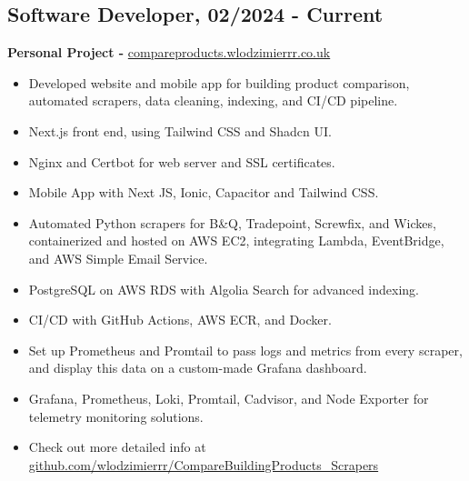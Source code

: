 \documentclass[a4paper,10pt]{article}
\begin{document}
\subsection*{Software Developer, 02/2024 - Current}
\textbf{Personal Project - } \href{https://compareproducts.wlodzimierrr.co.uk}{compareproducts.wlodzimierrr.co.uk}
\begin{itemize}
    \item Developed website and mobile app for building product comparison, automated scrapers, data cleaning, indexing, and CI/CD pipeline.
    \item Next.js front end, using Tailwind CSS and Shadcn UI.
    \item Nginx and Certbot for web server and SSL certificates.
    \item Mobile App with Next JS, Ionic, Capacitor and Tailwind CSS.
    \item Automated Python scrapers for B\&Q, Tradepoint, Screwfix, and Wickes, containerized and hosted on AWS EC2, integrating Lambda, EventBridge, and AWS Simple Email Service.
    \item PostgreSQL on AWS RDS with Algolia Search for advanced indexing.
    \item CI/CD with GitHub Actions, AWS ECR, and Docker.
    \item Set up Prometheus and Promtail to pass logs and metrics from every scraper, and display this data on a custom-made Grafana dashboard.
    \item Grafana, Prometheus, Loki, Promtail, Cadvisor, and Node Exporter for telemetry monitoring solutions.
    \item Check out more detailed info at \href{https://github.com/wlodzimierrr/CompareBuildingProducts\_Scrapers}{github.com/wlodzimierrr/CompareBuildingProducts\_Scrapers}
\end{itemize}
\end{document}
